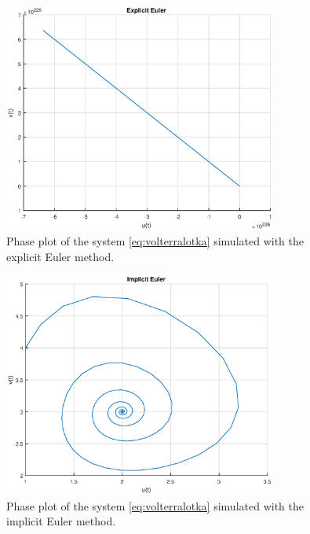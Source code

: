\documentclass{article}
\begin{document}
\begin{figure}[H]
    \centering
    \includegraphics[width = 0.8\textwidth]{modsim_ex6_1d_ee}
    \caption{Phase plot of the system \ref{eq:volterralotka} simulated with the explicit Euler method.}
    \label{fig:1d_ee}
\end{figure}

\begin{figure}[H]
    \centering
    \includegraphics[width = 0.8\textwidth]{modsim_ex6_1d_ie}
    \caption{Phase plot of the system \ref{eq:volterralotka} simulated with the implicit Euler method.}
    \label{fig:1d_ie}
\end{figure}
\end{document}
